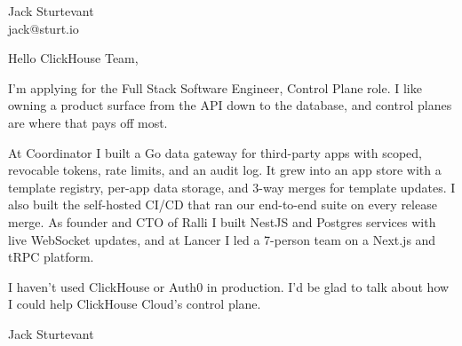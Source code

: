 \documentclass[11pt]{article}
\begin{document}
\raggedright

{\namefont\fontsize{20pt}{24pt}\selectfont Jack Sturtevant}\\[-0.3em]
jack@sturt.io

\vspace{1.2em}

Hello ClickHouse Team,

I'm applying for the Full Stack Software Engineer, Control Plane role. I like owning a product surface from the API down to the database, and control planes are where that pays off most.

At Coordinator I built a Go data gateway for third-party apps with scoped, revocable tokens, rate limits, and an audit log. It grew into an app store with a template registry, per-app data storage, and 3-way merges for template updates. I also built the self-hosted CI/CD that ran our end-to-end suite on every release merge. As founder and CTO of Ralli I built NestJS and Postgres services with live WebSocket updates, and at Lancer I led a 7-person team on a Next.js and tRPC platform.

I haven't used ClickHouse or Auth0 in production. I'd be glad to talk about how I could help ClickHouse Cloud's control plane.

\vspace{0.6em}
Jack Sturtevant
\end{document}
